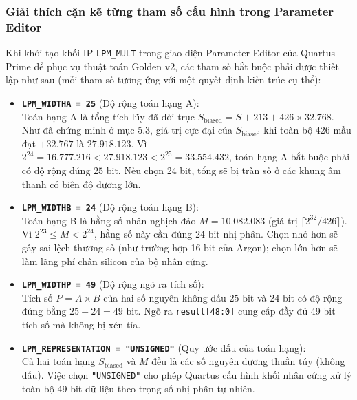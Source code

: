 \subsubsection*{Giải thích cặn kẽ từng tham số cấu hình trong Parameter Editor}
Khi khởi tạo khối IP \texttt{LPM\_MULT} trong giao diện Parameter Editor của Quartus Prime để phục vụ thuật toán Golden v2, các tham số bắt buộc phải được thiết lập như sau (mỗi tham số tương ứng với một quyết định kiến trúc cụ thể):

\begin{itemize}[leftmargin=1.5em, itemsep=4pt]
    \item \textbf{\texttt{LPM\_WIDTHA = 25}} (Độ rộng toán hạng A):\\
    Toán hạng A là tổng tích lũy đã dời trục $S_{\text{biased}} = S + 213 + 426 \times 32.768$. Như đã chứng minh ở mục 5.3, giá trị cực đại của $S_{\text{biased}}$ khi toàn bộ 426 mẫu đạt $+32.767$ là $27.918.123$. Vì $2^{24} = 16.777.216 < 27.918.123 < 2^{25} = 33.554.432$, toán hạng A bắt buộc phải có độ rộng đúng $25\text{ bit}$. Nếu chọn 24 bit, tổng sẽ bị tràn số ở các khung âm thanh có biên độ dương lớn.

    \item \textbf{\texttt{LPM\_WIDTHB = 24}} (Độ rộng toán hạng B):\\
    Toán hạng B là hằng số nhân nghịch đảo $M = 10.082.083$ (giá trị $\lceil 2^{32} / 426 \rceil$). Vì $2^{23} \le M < 2^{24}$, hằng số này cần đúng $24\text{ bit}$ nhị phân. Chọn nhỏ hơn sẽ gây sai lệch thương số (như trường hợp 16 bit của Argon); chọn lớn hơn sẽ làm lãng phí chân silicon của bộ nhân cứng.

    \item \textbf{\texttt{LPM\_WIDTHP = 49}} (Độ rộng ngõ ra tích số):\\
    Tích số $P = A \times B$ của hai số nguyên không dấu $25\text{ bit}$ và $24\text{ bit}$ có độ rộng đúng bằng $25 + 24 = 49\text{ bit}$. Ngõ ra \texttt{result[48:0]} cung cấp đầy đủ 49 bit tích số mà không bị xén tỉa.

    \item \textbf{\texttt{LPM\_REPRESENTATION = "UNSIGNED"}} (Quy ước dấu của toán hạng):\\
    Cả hai toán hạng $S_{\text{biased}}$ và $M$ đều là các số nguyên dương thuần túy (không dấu). Việc chọn \texttt{"UNSIGNED"} cho phép Quartus cấu hình khối nhân cứng xử lý toàn bộ 49 bit dữ liệu theo trọng số nhị phân tự nhiên.
    

\end{itemize}
